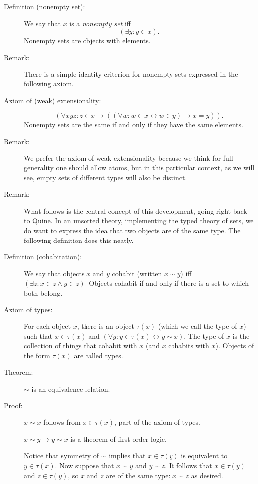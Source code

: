 \documentclass[12pt]{article}
\begin{document}
\begin{description}

\item[Definition (nonempty set):]  We say that $x$ is a {\em nonempty set\/} iff $$(\exists y:y \in x).$$ Nonempty sets are objects with elements.

\item[Remark:]  There is a simple identity criterion for nonempty sets expressed in the following axiom.

\item[Axiom of (weak) extensionality:]  $$(\forall xyz:z \in x \rightarrow ((\forall w:w \in x \leftrightarrow w \in y) \rightarrow x=y)).$$  Nonempty sets are the same if and only if they have the same elements.

\item[Remark:]  We prefer the axiom of weak extensionality because we think for full generality one should allow atoms, but in this particular context, as we will see, empty sets of different types will also be distinct.

\item[Remark:]  What follows is the central concept of this development, going right back to Quine.  In an unsorted theory, implementing the typed theory of sets, we do want to express the idea that two objects are of the same type.  The following definition does this neatly.

\item[Definition (cohabitation):]  We say that objects $x$ and $y$ cohabit (written $x \sim y$) iff $(\exists z:x \in z \wedge y \in z)$.  Objects cohabit if and only if there is a set to which both belong.

\item[Axiom of types:]  For each object $x$, there is an object $\tau(x)$ (which we call the type of $x$) such that $x \in \tau(x)$ and $(\forall y:y \in \tau(x) \leftrightarrow y \sim x)$.  The type of $x$ is the collection of things that cohabit with $x$ (and $x$ cohabits with $x$).  Objects of the form $\tau(x)$ are called types.

\item[Theorem:]  $\sim$ is an equivalence relation. 

\item[Proof:]  $x \sim x$ follows from $x \in \tau(x)$, part of the axiom of types.

$x \sim y\rightarrow y \sim x$ is a theorem of first order logic.

Notice that symmetry of $\sim$ implies that $x \in \tau(y)$ is equivalent to $y \in \tau(x)$.  Now suppose that $x \sim y$ and $y \sim z$.  It follows that
$x \in \tau(y)$ and $z \in \tau(y)$, so $x$ and $z$ are of the same type:  $x \sim z$ as desired.


\end{description}
\end{document}
